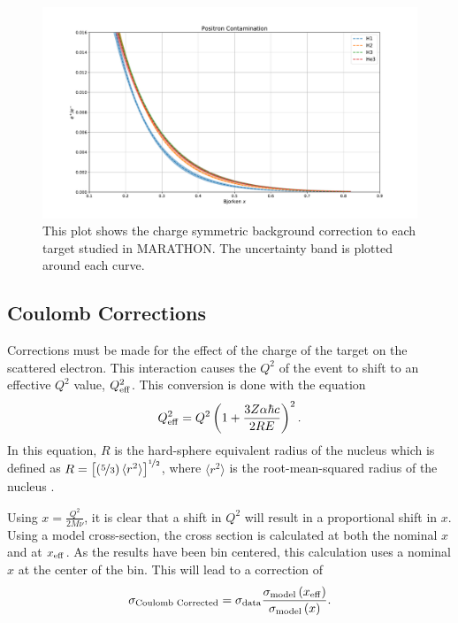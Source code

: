 \begin{figure}
	\includegraphics[width=\textwidth]{./analysis/fig/positrons.pdf}
	\caption{This plot shows the charge symmetric background correction to each target studied in MARATHON. The uncertainty band is plotted around each curve.}
	\label{fig:positrons}
\end{figure}

\subsection{Coulomb Corrections}

Corrections must be made for the effect of the charge of the target on the scattered electron. This interaction causes the $Q^2$ of the event to shift to an effective $Q^2$ value, $Q^2_{\rm eff}$. This conversion is done with the equation
\begin{equation}
	Q^2_{\rm eff} = Q^2 \left(1 + \frac{3Z\alpha\hbar c}{2RE}\right)^{2}.
\end{equation}
In this equation, $R$ is the hard-sphere equivalent radius of the nucleus which is defined as $R=\left[\left(\nicefrac{5}{3}\right) \langle r^{2}\rangle\right]^{\nicefrac{1}{2}}$, where $\langle r^2\rangle$ is the root-mean-squared radius of the nucleus \cite{coulomb}.

Using $x=\frac{Q^2}{2M\nu}$, it is clear that a shift in $Q^2$ will result in a proportional shift in $x$. Using a model cross-section, the cross section is calculated at both the nominal $x$ and at $x_{\rm eff}$. As the results have been bin centered, this calculation uses a nominal $x$ at the center of the bin. This will lead to a correction of
\begin{equation}
	\sigma_{\textrm{Coulomb Corrected}} = \sigma_{\rm data} \frac{\sigma_{\rm model}\left(x_{\rm eff}\right)}{\sigma_{\rm model}\left(x\right)}.
\end{equation}

